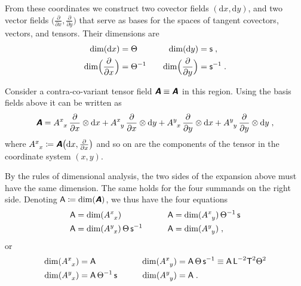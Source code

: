 \documentclass[a4paper,12pt,onecolumn,oneside,article,british]{memoir}
\makeatletter
\newcommand*{\mathte}[1]{\textbf{\textit{\textsf{#1}}}}
\newcommand*{\de}{\partial}%
\newcommand*{\di}{\mathrm{d}}%
\newcommand*{\defd}{\coloneqq}
\newcommand*{\q}{}%
\DeclareRobustCommand*{\q}{%
  \mathbin{\mathpalette\bigcdot@{}}%
}
\newcommand*{\bigcdot@scalefactor}{0.7}
\newcommand*{\bigcdot@widthfactor}{1.5}
\newcommand*{\bigcdot@}[2]{%
  \sbox0{$#1\vcenter{}$}%
  \sbox2{$#1\cdot\m@th$}%
  \hbox to \bigcdot@widthfactor\wd2{%
    \hfil
    \raise\ht0\hbox{%
      \scalebox{\bigcdot@scalefactor}{%
        \lower\ht0\hbox{$#1\bullet\m@th$}%
      }%
    }%
    \hfil
  }%
}
\newcommand*{\Le}{\textsf{L}}
\newcommand*{\Ti}{\textsf{T}}
\newcommand*{\Te}{\Theta}
\newcommand*{\Ent}{\textsf{s}}
\newcommand*{\Aa}{\textsf{A}}
\newcommand*{\yA}{\mathte{A}}
\renewcommand*{\i}{\indices}
\newcommand*{\dex}[1][i]{\frac{\de}{\de x^{#1}}}
\newcommand*{\dix}[1][i]{\di x^{#1}}
\makeatother
\begin{document}
From these coordinates we construct two covector fields $(\di x, \di y)$,
and two vector fields $\bigl(\frac{\de}{\de x}, \frac{\de}{\de y}\bigr)$
that serve as bases for the spaces of tangent covectors, vectors, and
tensors. Their dimensions are
\begin{equation}
  \label{eq:example_basisvects2d}
  \begin{aligned}
  \dim(\di x)&=\Te &\quad
                        \dim(\di y)&= \Ent \;,
                                     \\
  \dim\Bigl(\frac{\de}{\de x}\Bigr)&=\Te^{-1} &\quad
                        \dim\Bigl(\frac{\de}{\de y}\Bigr)&= \Ent^{-1} \;.
  \end{aligned}
\end{equation}


Consider a contra-co-variant tensor field $\yA \equiv \yA\i{^{\q}_{\q}}$ in
this region. Using the basis fields above it can be written as
\begin{equation}
  \label{eq:expansion_tensor_2d}
  \yA = %
  A\i{^{x}_{x}}\,\frac{\de}{\de x} \otimes\di x + 
  A\i{^{x}_{y}}\,\frac{\de}{\de x} \otimes\di y + 
  A\i{^{y}_{x}}\,\frac{\de}{\de y} \otimes\di x + 
  A\i{^{y}_{y}}\,\frac{\de}{\de y} \otimes\di y \;,
\end{equation}
where $A\i{^{x}_{x}} \defd \yA\bigl(\di x, \frac{\de}{\de x}\bigr)$ and so
on are the components of the tensor in the coordinate system $(x, y)$.

By the rules of dimensional analysis, the two sides of the expansion above
must have the same dimension. The same holds for the four summands on the
right side. Denoting $\Aa \defd \dim(\yA)$, we thus have the four equations
\begin{equation*}
  \label{eq:four_dims_2d_pre}
  \begin{aligned}
    \Aa &= \dim(A\i{^{x}_{x}}) &\qquad \Aa &=
 \dim(A\i{^{x}_{y}})\,\Te^{-1}\,\Ent 
 \\
    \Aa &= \dim(A\i{^{y}_{x}})\,\Te\,\Ent^{-1} &\qquad \Aa &=
 \dim(A\i{^{y}_{y}}) \;,
  \end{aligned}
\end{equation*}
or
\begin{equation}
  \label{eq:four_dims_2d}
  \begin{aligned}
    \dim(A\i{^{x}_{x}}) &= \Aa\, &\qquad 
 \dim(A\i{^{x}_{y}}) &=\Aa\,\Te\,\Ent^{-1} \equiv
\Aa\,\Le^{-2}\Ti^{2}\Te^{2}
    \\
    \dim(A\i{^{y}_{x}}) &= \Aa\,\Te^{-1}\,\Ent &\qquad
 \dim(A\i{^{y}_{y}}) &= \Aa \;.
  \end{aligned}
\end{equation}
\end{document}
